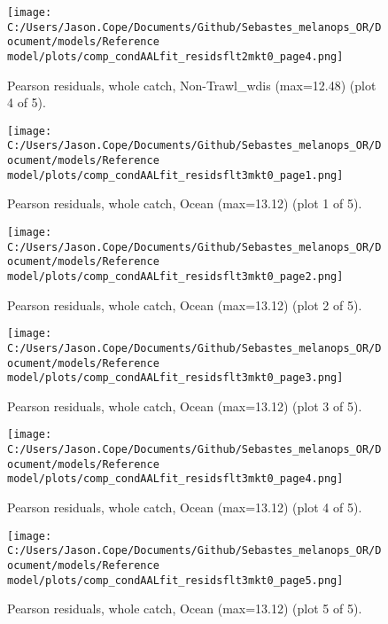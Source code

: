 \documentclass[11pt,
  english,
  letterpaper,
]{article}
\begin{document}
\begin{figure}
\centering
\texttt{[image: C:/Users/Jason.Cope/Documents/Github/Sebastes\_melanops\_OR/Document/models/Reference model/plots/comp\_condAALfit\_residsflt2mkt0\_page4.png]}
\caption{Pearson residuals, whole catch, Non-Trawl\_wdis (max=12.48) (plot 4 of 5).\label{fig:comp_condAALfit_residsflt2mkt0_page4}}
\end{figure}

\begin{figure}
\centering
\texttt{[image: C:/Users/Jason.Cope/Documents/Github/Sebastes\_melanops\_OR/Document/models/Reference model/plots/comp\_condAALfit\_residsflt3mkt0\_page1.png]}
\caption{Pearson residuals, whole catch, Ocean (max=13.12) (plot 1 of 5).\label{fig:comp_condAALfit_residsflt3mkt0_page1}}
\end{figure}

\begin{figure}
\centering
\texttt{[image: C:/Users/Jason.Cope/Documents/Github/Sebastes\_melanops\_OR/Document/models/Reference model/plots/comp\_condAALfit\_residsflt3mkt0\_page2.png]}
\caption{Pearson residuals, whole catch, Ocean (max=13.12) (plot 2 of 5).\label{fig:comp_condAALfit_residsflt3mkt0_page2}}
\end{figure}

\begin{figure}
\centering
\texttt{[image: C:/Users/Jason.Cope/Documents/Github/Sebastes\_melanops\_OR/Document/models/Reference model/plots/comp\_condAALfit\_residsflt3mkt0\_page3.png]}
\caption{Pearson residuals, whole catch, Ocean (max=13.12) (plot 3 of 5).\label{fig:comp_condAALfit_residsflt3mkt0_page3}}
\end{figure}

\begin{figure}
\centering
\texttt{[image: C:/Users/Jason.Cope/Documents/Github/Sebastes\_melanops\_OR/Document/models/Reference model/plots/comp\_condAALfit\_residsflt3mkt0\_page4.png]}
\caption{Pearson residuals, whole catch, Ocean (max=13.12) (plot 4 of 5).\label{fig:comp_condAALfit_residsflt3mkt0_page4}}
\end{figure}

\begin{figure}
\centering
\texttt{[image: C:/Users/Jason.Cope/Documents/Github/Sebastes\_melanops\_OR/Document/models/Reference model/plots/comp\_condAALfit\_residsflt3mkt0\_page5.png]}
\caption{Pearson residuals, whole catch, Ocean (max=13.12) (plot 5 of 5).\label{fig:comp_condAALfit_residsflt3mkt0_page5}}
\end{figure}
\end{document}
